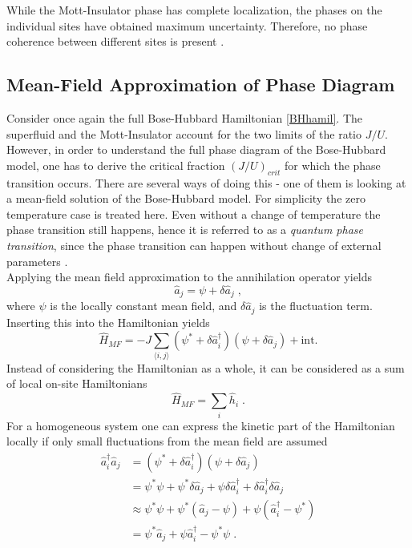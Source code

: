While the Mott-Insulator phase has complete localization, the phases on the individual sites have obtained maximum uncertainty. Therefore, no phase coherence between different sites is present \cite{greiner}.


\subsection{Mean-Field Approximation of Phase Diagram}
Consider once again the full Bose-Hubbard Hamiltonian \eqref{BHhamil}. The superfluid and the Mott-Insulator account for the two limits of the ratio $J/U$. However, in order to understand the full phase diagram of the Bose-Hubbard model, one has to derive the critical fraction $(J/U)_{crit}$ for which the phase transition occurs. There are several ways of doing this - one of them is looking at a mean-field solution of the Bose-Hubbard model. For simplicity the zero temperature case is treated here. Even without a change of temperature the phase transition still happens, hence it is referred to as a \textit{quantum phase transition}, since the phase transition can happen without change of external parameters \cite{Sachdev2007QPT}.\\
Applying the mean field approximation to the annihilation operator yields
\begin{equation}
	\hat{a}_j = \psi + \delta \hat{a}_j \; ,
\end{equation}
where $\psi$ is the locally constant mean field, and $\delta \hat{a}_j$ is the fluctuation term. Inserting this into the Hamiltonian yields
\begin{equation}
	\hat{H}_{MF} = -J \sum_{\langle i,j \rangle} \left( \psi^* + \delta \hat{a}_{i}^{\dag} \right) \left( \psi + \delta \hat{a}_{j} \right) + \text{int.}
\end{equation}
Instead of considering the Hamiltonian as a whole, it can be considered as a sum of local on-site Hamiltonians
\begin{equation}
	\hat{H}_{MF} = \sum_{i} \hat{h}_i \; .
\end{equation}
For a homogeneous system one can express the kinetic part of the Hamiltonian locally if only small fluctuations from the mean field are assumed
\begin{align}
  \hat{a}_{i}^{\dag} \hat{a}_{j} &= \left( \psi^* + \delta \hat{a}_{i}^{\dag} \right) \left( \psi + \delta \hat{a}_{j} \right) \nonumber \\
  &= \psi^* \psi + \psi^* \delta \hat{a}_j + \psi \delta \hat{a}_{i}^{\dag} + \delta \hat{a}_{i}^{\dag} \delta \hat{a}_{j} \nonumber \\
  & \approx \psi^* \psi + \psi^* \left( \hat{a}_j - \psi \right) + \psi \left( \hat{a}_{i}^{\dag} - \psi^* \right) \nonumber \\
&= \psi^* \hat{a}_j + \psi \hat{a}_{i}^{\dag} - \psi^* \psi \; .
\end{align}
